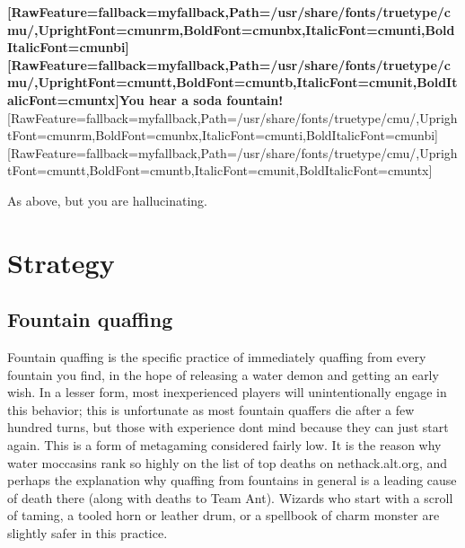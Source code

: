 {\bfseries \allowbreak{}\setmainfont{cmunbx.ttf}[RawFeature={fallback=myfallback},Path=/usr/share/fonts/truetype/cmu/,UprightFont=cmunrm,BoldFont=cmunbx,ItalicFont=cmunti,BoldItalicFont=cmunbi]\setmonofont{cmunbx.ttf}[RawFeature={fallback=myfallback},Path=/usr/share/fonts/truetype/cmu/,UprightFont=cmuntt,BoldFont=cmuntb,ItalicFont=cmunit,BoldItalicFont=cmuntx]\bfseries You hear a soda fountain!}\allowbreak{}\setmainfont{cmunrm.ttf}[RawFeature={fallback=myfallback},Path=/usr/share/fonts/truetype/cmu/,UprightFont=cmunrm,BoldFont=cmunbx,ItalicFont=cmunti,BoldItalicFont=cmunbi]\setmonofont{cmunrm.ttf}[RawFeature={fallback=myfallback},Path=/usr/share/fonts/truetype/cmu/,UprightFont=cmuntt,BoldFont=cmuntb,ItalicFont=cmunit,BoldItalicFont=cmuntx]

\begin{myquote}
\item{}As above, but you are hallucinating\footnotemark[89].
\end{myquote}

\section{Strategy}
\label{10}
\subsection{Fountain quaffing}
\label{11}
Fountain quaffing is the specific practice of immediately quaffing from every fountain you find, in the hope of releasing a water demon\footnotemark[90] and getting an early wish\footnotemark[91]. In a lesser form, most inexperienced players will unintentionally engage in this behavior; this is unfortunate as most fountain quaffers die after a few hundred turns, but those with experience don\textquotesingle{}t mind because they can just start again. This is a form of metagaming\footnotemark[92] considered fairly low. It is the reason why water moccasins\footnotemark[93] rank so highly on the list of top deaths\footnotemark[94] on nethack.alt.org\footnotemark[95], and perhaps the explanation why quaffing from fountains in general is a leading cause of death there (along with deaths to Team Ant\footnotemark[96]).  Wizards who start with a scroll of taming, a tooled horn\footnotemark[97] or leather drum\footnotemark[98], or a spellbook of charm monster\footnotemark[99] are slightly safer in this practice.



